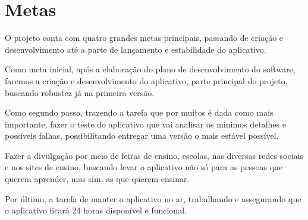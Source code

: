 \chapter[Metas]{Metas}

O projeto conta com quatro grandes metas principais, passando de criação e desenvolvimento até a parte de lançamento e estabilidade do aplicativo. 

Como meta inicial, após a elaboração do plano de desenvolvimento do software, faremos a criação e desenvolvimento do aplicativo, parte principal do projeto, buscando robustez já na primeira versão.

Como segundo passo, trazendo a tarefa que por muitos é dada como mais importante, fazer o teste do aplicativo que vai analisar os mínimos detalhes e possíveis falhas, possibilitando entregar uma versão o mais estável possível. 

Fazer a divulgação por meio de feiras de ensino, escolas, nas diversas redes sociais e nos sites de ensino, buscando levar o aplicativo não só para as pessoas que querem aprender, mas sim, as que querem ensinar.

Por último, a tarefa de manter o aplicativo no ar, trabalhando e assegurando que o aplicativo ficará 24 horas disponível e funcional.


